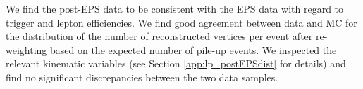 
We find the post-EPS data to be consistent with the EPS data with regard to trigger and
lepton efficiencies. We find good agreement between data and MC for the distribution of the number
of reconstructed vertices per event after re-weighting based on the expected number of pile-up events.
We inspected the relevant kinematic variables (see Section \ref{app:lp_postEPSdist} for details) and find no significant
discrepancies between the two data samples.


